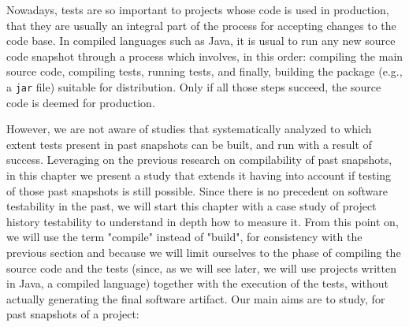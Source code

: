 Nowadays, tests are so important to projects whose code is used in production, that they are usually an integral part of the process for accepting changes to the code base. 
In compiled languages such as Java, it is usual to run any new source code snapshot through a process which involves, in this order: compiling the main source code, compiling tests, running tests, and finally, building the package (e.g., a \texttt{jar} file) suitable for distribution. 
Only if all those steps succeed, the source code is deemed for production.



However, we are not aware of studies that systematically analyzed to which extent tests present in past snapshots can be built, and run with a result of success. Leveraging on the previous research on compilability of past snapshots, in this chapter we present a study that extends it having into account if testing of those past snapshots is still possible. 
Since there is no precedent on software testability in the past, we will start this chapter with a case study of project history testability to understand in depth how to measure it.
From this point on, we will use the term "compile" instead of "build", for consistency with the previous section and because we will limit ourselves to the phase of compiling the source code and the tests (since, as we will see later, we will use projects written in Java, a compiled language) together with the execution of the tests, without actually generating the final software artifact.
Our main aims are to study, for past snapshots of a project:

